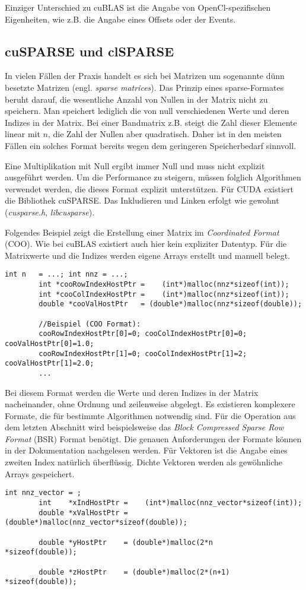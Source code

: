 		Einziger Unterschied zu cuBLAS ist die Angabe von OpenCl-spezifischen Eigenheiten, wie z.B. die Angabe eines Offsets oder	
der Events.
		
		\subsection{cuSPARSE und clSPARSE}
		In vielen Fällen der Praxis handelt es sich bei Matrizen um sogenannte dünn besetzte Matrizen (engl. \textit{sparse matrices}). Das Prinzip eines sparse-Formates beruht darauf, die wesentliche Anzahl von Nullen in der Matrix nicht zu speichern. Man speichert lediglich die von null verschiedenen Werte und deren Indizes in der Matrix. Bei einer Bandmatrix z.B. steigt die Zahl dieser Elemente linear mit $n$, die Zahl der Nullen aber quadratisch. Daher ist in den meisten Fällen ein solches Format bereits wegen dem geringeren Speicherbedarf sinnvoll. 
		
		Eine Multiplikation mit Null ergibt immer Null und muss nicht explizit ausgeführt werden. Um die Performance zu steigern, müssen folglich Algorithmen verwendet werden, die dieses Format explizit unterstützen. Für CUDA existiert die Bibliothek cuSPARSE. Das Inkludieren und Linken erfolgt wie gewohnt (\textit{cusparse.h}, \textit{libcusparse}).
		
		Folgendes Beispiel zeigt die Erstellung einer Matrix im \textit{Coordinated Format} (COO). Wie bei cuBLAS existiert auch hier kein expliziter Datentyp. Für die Matrixwerte und die Indizes werden eigene Arrays erstellt und manuell belegt.	
		\begin{lstlisting}[caption=cuSPARSE: Matrix erstellen]
		int n   = ...; int nnz = ...;
		int *cooRowIndexHostPtr =    (int*)malloc(nnz*sizeof(int));
		int *cooColIndexHostPtr =    (int*)malloc(nnz*sizeof(int));
		double *cooValHostPtr   = (double*)malloc(nnz*sizeof(double));

		//Beispiel (COO Format): 
		cooRowIndexHostPtr[0]=0; cooColIndexHostPtr[0]=0; cooValHostPtr[0]=1.0;
		cooRowIndexHostPtr[1]=0; cooColIndexHostPtr[1]=2; cooValHostPtr[1]=2.0;
		...		
		\end{lstlisting}

		Bei diesem Format werden die Werte und deren Indizes in der Matrix nacheinander, ohne Ordnung und zeilenweise abgelegt. Es existieren komplexere Formate, die für bestimmte Algorithmen notwendig sind. Für die Operation aus dem letzten Abschnitt wird beispielsweise das \textit{Block Compressed Sparse Row Format} (BSR) Format benötigt. Die genauen Anforderungen der Formate können in der Dokumentation nachgelesen werden. \cite{cusparseDoc}
		Für Vektoren ist die Angabe eines zweiten Index natürlich überflüssig. Dichte Vektoren werden als gewöhnliche Arrays gespeichert.
		\begin{lstlisting}[caption=cuSPARSE: Vektor erstellen]
		int nnz_vector = ;
		int    *xIndHostPtr =    (int*)malloc(nnz_vector*sizeof(int));
		double *xValHostPtr = (double*)malloc(nnz_vector*sizeof(double));
    
		double *yHostPtr    = (double*)malloc(2*n       *sizeof(double));
    
		double *zHostPtr    = (double*)malloc(2*(n+1)   *sizeof(double));
		\end{lstlisting}

